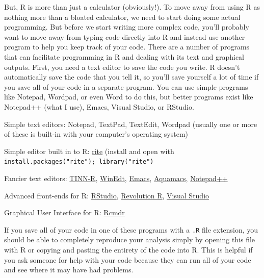 \documentclass[12pt]{article}\usepackage[]{graphicx}\usepackage[]{color}
\begin{document}
But, R is more than just a calculator (obviously!). To move away from using R as nothing more than a bloated calculator, we need to start doing some actual programming. But before we start writing more complex code, you'll probably want to move away from typing code directly into R and instead use another program to help you keep track of your code. There are a number of programs that can facilitate programming in R and dealing with its text and graphical outputs. First, you need a text editor to save the code you write. R doesn't automatically save the code that you tell it, so you'll save yourself a lot of time if you save all of your code in a separate program. You can use simple programs like Notepad, Wordpad, or even Word to do this, but better programs exist like Notepad++ (what I use), Emacs, Visual Studio, or RStudio.%
\begin{itemize*}
\item Simple text editors: Notepad, TextPad, TextEdit, Wordpad (usually one or more of these is built-in with your computer's operating system)
\item Simple editor built in to R: \href{https://cran.r-project.org/web/packages/rite/index.html}{rite} (install and open with \texttt{install.packages("rite"); library("rite")}
\item Fancier text editors: \href{http://sciviews.org/Tinn-R/}{TINN-R}, \href{http://www.winedt.com/}{WinEdt}, \href{http://www.gnu.org/software/emacs/}{Emacs}, \href{http://aquamacs.org/}{Aquamacs}, \href{http://notepad-plus-plus.org/}{Notepad++}
\item Advanced front-ends for R: \href{http://rstudio.org/}{RStudio}, \href{http://www.revolutionanalytics.com/products/revolution-enterprise.php}{Revolution R}, \href{https://www.visualstudio.com/}{Visual Studio}
\item Graphical User Interface for R: \href{http://socserv.mcmaster.ca/jfox/Misc/Rcmdr/}{Rcmdr}
\end{itemize*}

If you save all of your code in one of these programs with a \texttt{.R} file extension, you should be able to completely reproduce your analysis simply by opening this file with R or copying and pasting the entirety of the code into R. This is helpful if you ask someone for help with your code because they can run all of your code and see where it may have had problems.
\end{document}
